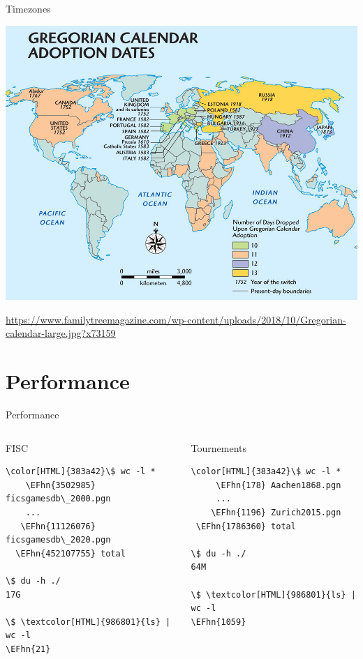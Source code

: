 \documentclass[presentation, 8pt]{beamer}
\newcommand{\EFhn}[1]{\textcolor{EFhn}{\textbf{#1}}} %
\begin{document}
\begin{frame}[label={sec:org79ba730}]{Timezones}
\begin{center}
\includegraphics[width=.9\linewidth]{Images/Gregorian-calendar-large.jpg}
\end{center}
\url{https://www.familytreemagazine.com/wp-content/uploads/2018/10/Gregorian-calendar-large.jpg?x73159}
\end{frame}
\section{Performance}
\label{sec:org7b4d0a2}
\begin{frame}[label={sec:org8ff19ae},fragile]{Performance}
 \begin{columns}
\begin{column}{0.45\columnwidth}
\begin{block}{FISC}
\begin{Code}
\begin{Verbatim}[]
\color[HTML]{383a42}\$ wc -l *
    \EFhn{3502985} ficsgamesdb\_2000.pgn
    ...
   \EFhn{11126076} ficsgamesdb\_2020.pgn
  \EFhn{452107755} total

\$ du -h ./
17G

\$ \textcolor[HTML]{986801}{ls} | wc -l
\EFhn{21}
\end{Verbatim}
\end{Code}
\end{block}
\end{column}

\begin{column}{0.45\columnwidth}
\begin{block}{Tournements}
\begin{Code}
\begin{Verbatim}[]
\color[HTML]{383a42}\$ wc -l *
     \EFhn{178} Aachen1868.pgn
     ...
    \EFhn{1196} Zurich2015.pgn
 \EFhn{1786360} total

\$ du -h ./
64M

\$ \textcolor[HTML]{986801}{ls} | wc -l
\EFhn{1059}
\end{Verbatim}
\end{Code}
\end{block}
\end{column}
\end{columns}
\end{frame}
\end{document}

